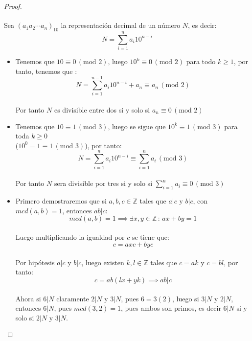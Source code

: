 \documentclass[11pt,letterpaper]{article}
\newcommand{\Z}{\mathbb{Z}}
\begin{document}
\begin{proof}\,\\
    \,\\
    Sea $(a_1a_2\cdots a_n)_{10}$ la representaci\'on decimal de un n\'umero $N$, es decir:
    \begin{equation*}
        N=\sum_{i=1}^{n} a_i 10^{n-i}
    \end{equation*}
    \begin{itemize}
        \item Tenemos que $10\equiv 0\,(\text{mod }2)$, luego $10^k\equiv 0\,(\text{mod }2)$ para todo $k\geq 1$, por tanto, tenemos que :\,\\
        \begin{equation*}
            N=\sum_{i=1}^{n-1} a_i 10^{n-i}+a_n\equiv a_n\,(\text{mod }2)
        \end{equation*}\,\\
        Por tanto $N$ es divisible entre dos si y solo si $a_n \equiv 0\,(\text{mod }2)$
        \item Tenemos que $10\equiv 1\,(\text{mod }3)$, luego se sigue que $10^k\equiv 1\,(\text{mod }3)$ para toda $k\geq 0$ \\
        ($10^0=1\equiv 1\,(\text{mod }3)$), por tanto:\,\\
        \begin{equation*}
            N=\sum_{i=1}^{n} a_i 10^{n-i}\equiv \sum_{i=1}^{n} a_i\,(\text{mod }3)
        \end{equation*}\,\\
        Por tanto $N$ sera divisible por tres si y solo si $\sum_{i=1}^{n} a_i \equiv 0\,(\text{mod }3)$
        \item Primero demostraremos que si $a,b,c\in \Z$ tales que $a|c$ y $b|c$, con $mcd(a,b)=1$, entonces $ab|c$:\,\\
        \begin{equation*}
            mcd(a,b)=1 \implies \exists x,y\in \Z\,:\,ax+by=1
        \end{equation*}\,\\
        Luego multiplicando la igualdad por $c$ se tiene que:\,\\
        \begin{equation*}
            c=axc+byc
        \end{equation*}\,\\
        Por hip\'otesis $a|c$ y $b|c$, luego existen $k,l\in \Z$ tales que $c=ak$ y $c=bl$, por tanto:\,\\
        \begin{equation*}
            c=ab(lx+yk)\implies ab|c
        \end{equation*}\,\\
        Ahora si $6|N$ claramente $2|N$ y $3|N$, pues $6=3(2)$, luego si $3|N$ y $2|N$, entonces $6|N$, pues $mcd(3,2)=1$, pues ambos son primos, es decir $6|N$ si y solo si
        $2|N$ y $3|N$. 
    \end{itemize}
\end{proof}
\end{document}
